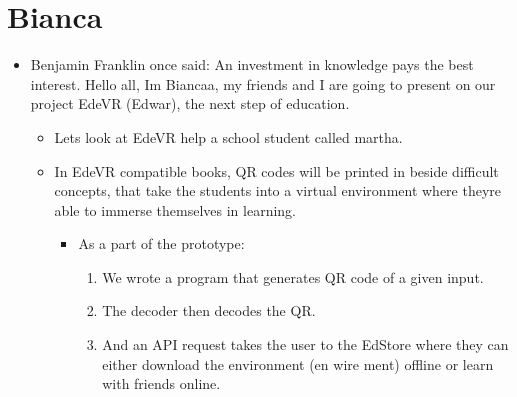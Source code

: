 \documentclass[11pt]{article}
\begin{document}
\section{Bianca}
\label{sec:org10ded2e}
\begin{itemize}
\item Benjamin Franklin once said: An investment in knowledge pays the best interest. Hello all, Im Biancaa, my friends and I are going to present on our project EdeVR (Edwar), the next step of education.
\begin{itemize}
\item Lets look at EdeVR help a school student called martha.
\item In EdeVR compatible books, QR codes will be printed in beside difficult concepts, that take the students into a virtual environment where theyre able to immerse themselves in learning.
\begin{itemize}
\item As a part of the prototype:
\begin{enumerate}
\item We wrote a program that generates QR code of a given input.
\item The decoder then decodes the QR.
\item And an API request takes the user to the EdStore where they can either download the environment (en wire ment) offline or learn with friends online.
\end{enumerate}
\end{itemize}
\end{itemize}
\end{itemize}
\end{document}
